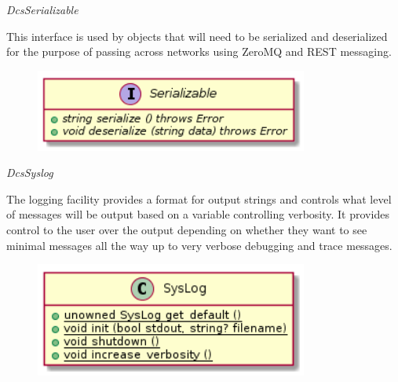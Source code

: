       \emph{DcsSerializable}

      \vspace*{-0.75cm}
      \begin{minipage}[t]{0.5\textwidth}
        \vspace*{0.5cm}
        This interface is used by objects that will need to be serialized and
        deserialized for the purpose of passing across networks using ZeroMQ and
        REST messaging.
      \end{minipage} \hfill
      \begin{minipage}[t]{0.45\textwidth}
        \begin{figure}[H]
          \includegraphics[width=0.8\textwidth]{figures/design/class/core/serializable}
          \label{fig:dsg-classes-serializable}
        \end{figure}
      \end{minipage}

      \emph{DcsSyslog}

      \vspace*{-0.75cm}
      \begin{minipage}[t]{0.5\textwidth}
        \vspace*{0.5cm}
        The logging facility provides a format for output strings and controls
        what level of messages will be output based on a variable controlling
        verbosity. It provides control to the user over the output depending on
        whether they want to see minimal messages all the way up to very
        verbose debugging and trace messages.
      \end{minipage} \hfill
      \begin{minipage}[t]{0.45\textwidth}
        \begin{figure}[H]
          \includegraphics[width=0.8\textwidth]{figures/design/class/core/syslog}
          \label{fig:dsg-classes-syslog}
        \end{figure}
      \end{minipage}

